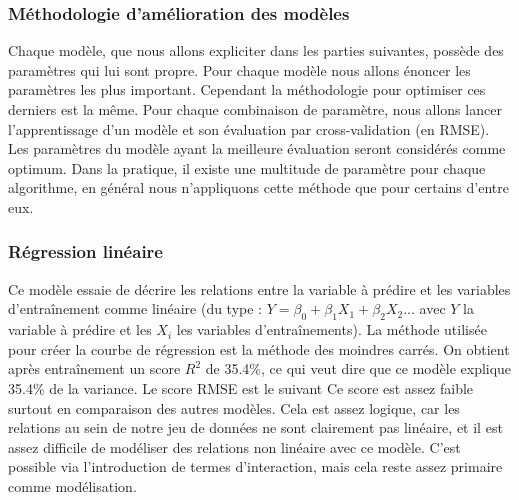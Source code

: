 \documentclass{article} %
\begin{document}
\subsubsection{Méthodologie d'amélioration des modèles}
Chaque modèle, que nous allons expliciter dans les parties suivantes, possède des paramètres qui lui sont propre. Pour chaque modèle nous allons énoncer les paramètres les plus important. Cependant la méthodologie pour optimiser ces derniers est la même. Pour chaque combinaison de paramètre, nous allons lancer l'apprentissage d'un modèle et son évaluation par cross-validation (en RMSE).\\
Les paramètres du modèle ayant la meilleure évaluation seront considérés comme optimum. Dans la pratique, il existe une multitude de paramètre pour chaque algorithme, en général nous n'appliquons cette méthode que pour certains d'entre eux.


\subsubsection{Régression linéaire}
Ce modèle essaie de décrire les relations entre la variable à prédire et les variables d'entraînement comme linéaire (du type : $Y = \beta_0 + \beta_1X_1 + \beta_2X_2 ...$ avec $Y$ la variable à prédire et les $X_i$ les variables d'entraînements). La méthode utilisée pour créer la courbe de régression est la méthode des moindres carrés. On obtient après entraînement un score $R^2$ de 35.4\%, ce qui veut dire que ce modèle explique 35.4\% de la variance. Le score RMSE est le suivant
Ce score est assez faible surtout en comparaison des autres modèles. Cela est assez logique, car les relations au sein de notre jeu de données ne sont clairement pas linéaire, et il est assez difficile de modéliser des relations non linéaire avec ce modèle. C'est possible via l'introduction de termes d'interaction, mais cela reste assez primaire comme modélisation.
\end{document}
